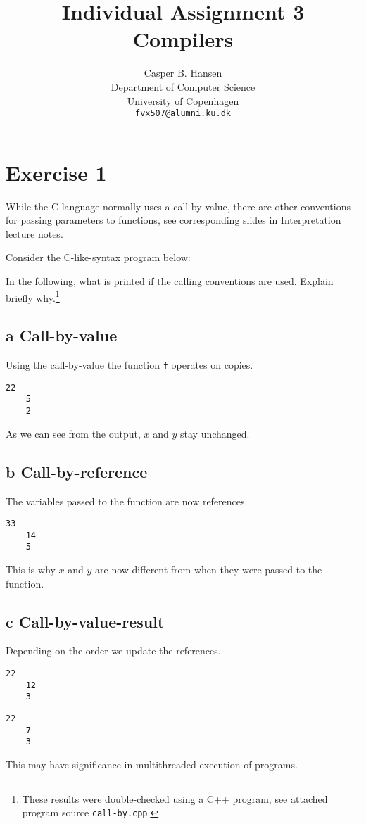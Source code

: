 \documentclass[11pt,a4paper]{article}
\title
{
	{\large Individual Assignment 3}\\
	Compilers
}
\author
{
	Casper B. Hansen\\
	Department of Computer Science\\
	University of Copenhagen\\
	{\tt fvx507@alumni.ku.dk}
}
\begin{document}
\clearpage
\maketitle

\section{Exercise 1}
While the C language normally uses a call-by-value, there are other
conventions for passing parameters to functions, see corresponding slides in
Interpretation lecture notes.

Consider the C-like-syntax program below:

In the following, what is printed if the calling conventions are used. Explain
briefly why.\footnote{These results were double-checked using a C++ program,
see attached program source {\tt call-by.cpp}.}
\begin{multicols}{3}

\subsection*{a \mdseries Call-by-value}
Using the call-by-value the function {\tt f} operates on copies.
\begin{lstlisting}[numbers=none]
	22
	5
	2
\end{lstlisting}
As we can see from the output, $x$ and $y$ stay unchanged.

\vfill\columnbreak

\subsection*{b \mdseries Call-by-reference}
The variables passed to the function are now references.
\begin{lstlisting}[numbers=none]
	33
	14
	5
\end{lstlisting}
This is why $x$ and $y$ are now different from when they were passed to the
function.

\vfill\columnbreak

\subsection*{c \mdseries Call-by-value-result}
Depending on the order we update the references.
\vspace{-0.23in}
\begin{multicols}{2}
\begin{lstlisting}[numbers=none]
	22
	12
	3
\end{lstlisting}
\vfill\columnbreak
\begin{lstlisting}[numbers=none]
	22
	7
	3
\end{lstlisting}
\vfill
\end{multicols}
\vspace{-0.21in}
\noindent This may have significance in multithreaded execution of programs.
\vfill
\end{multicols}
\end{document}
